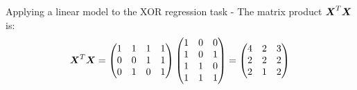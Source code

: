 \begin{frame}[t,allowframebreaks]{
    Applying a linear model to the XOR regression task -}
    The matrix product $\boldsymbol{X}^T \boldsymbol{X}$ is:\\
    \vspace{-0.3cm}
    \begin{equation}
        \boldsymbol{X}^T \boldsymbol{X} = 
        \begin{pmatrix}
            1 & 1 & 1 & 1 \\
            0 & 0 & 1 & 1 \\
            0 & 1 & 0 & 1 \\
        \end{pmatrix} 
        \begin{pmatrix}
            1 & 0 & 0 \\
            1 & 0 & 1 \\
            1 & 1 & 0 \\
            1 & 1 & 1 \\
        \end{pmatrix} =
        \begin{pmatrix}
            4 & 2 & 3 \\
            2 & 2 & 2 \\
            2 & 1 & 2 \\
        \end{pmatrix} 
    \end{equation}        


\end{frame}
